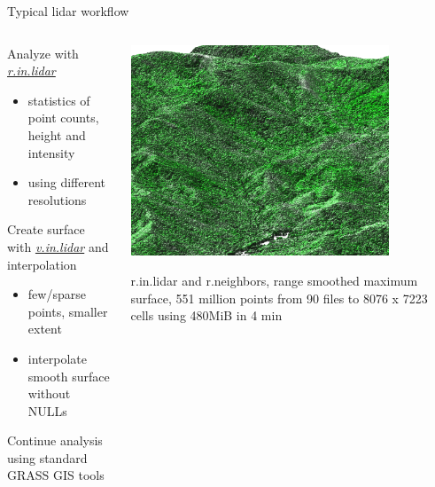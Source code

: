 \documentclass[xcolor={dvipsnames,usenames},beamer,aspectratio=169]{beamer}
\newcommand{\gmodule}[1]{\href{http://grass.osgeo.org/grass71/manuals/#1.html}{\emph{#1}}}
\begin{document}
\begin{frame}{Typical lidar workflow}


\begin{columns}
\begin{column}{0.5\textwidth}

Analyze with \gmodule{r.in.lidar}
 \begin{itemize}
  \item statistics of point counts, height and intensity
  \item using different resolutions
 \end{itemize}

Create surface with \gmodule{v.in.lidar} and interpolation
 \begin{itemize}
  \item few/sparse points, smaller extent
  \item interpolate smooth surface without NULLs
  \end{itemize}

Continue analysis using standard GRASS GIS tools

\end{column}
\begin{column}{0.45\textwidth}

\begin{center}
  \includegraphics[width=0.8\textwidth]{grass/range_on_smooth_max_larger}

  \footnotesize
  r.in.lidar and r.neighbors, range smoothed maximum surface,
  551 million points from 90 files to 8076 x 7223 cells
  using 480MiB in 4 min
\end{center}


\end{column}
\end{columns}
\end{frame}
\end{document}
